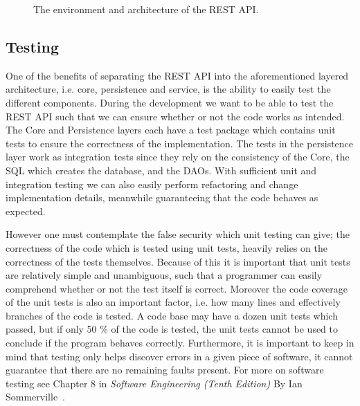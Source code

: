 \begin{figure}[h]
    \centering
    
    \caption{The environment and architecture of the REST API.}
    \label{fig:rest-architecture}
\end{figure}

\subsection{Testing}
One of the benefits of separating the REST API into the aforementioned layered architecture, i.e. core, persistence and service, is the ability to easily test the different components.
During the development we want to be able to test the REST API such that we can ensure whether or not the code works as intended.
The Core and Persistence layers each have a test package which contains unit tests to ensure the correctness of the implementation.
The tests in the persistence layer work as integration tests since they rely on the consistency of the Core, the SQL which creates the database, and the DAOs.
With sufficient unit and integration testing we can also easily perform refactoring and change implementation details, meanwhile guaranteeing that the code behaves as expected.

However one must contemplate the false security which unit testing can give; the correctness of the code which is tested using unit tests, heavily relies on the correctness of the tests themselves.
Because of this it is important that unit tests are relatively simple and unambiguous, such that a programmer can easily comprehend whether or not the test itself is correct.
Moreover the code coverage of the unit tests is also an important factor, i.e. how many lines and effectively branches of the code is tested.
A code base may have a dozen unit tests which passed, but if only 50 \% of the code is tested, the unit tests cannot be used to conclude if the program behaves correctly.
Furthermore, it is important to keep in mind that testing only helps discover errors in a given piece of software, it cannot guarantee that there are no remaining faults present. For more on software testing see Chapter 8 in \textit{Software Engineering (Tenth Edition)} By Ian Sommerville~\cite[Chapter~8]{SEBOOK}.
